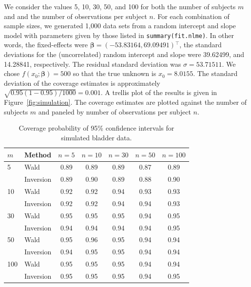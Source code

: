 \documentclass{article}\usepackage[]{graphicx}\usepackage[]{color}
\newcommand{\trans}{\ensuremath{^\top}}
\begin{document}
We consider the values 5, 10, 30, 50, and 100 for both the number of subjects $m$ and and the number of observations per subject $n$.  For each combination of sample sizes, we generated 1,000 data sets from a random intercept and slope model with parameters given by those listed in \texttt{summary(fit.nlme)}.  In other words, the fixed-effects were $\bm{\beta} = \left(-53.83164, 69.09491\right)\trans$, the standard deviations for the (uncorrelated) random intercept and slope were 39.62499, and 14.28841, respectively.  The residual standard deviation was $\sigma = 53.71511$.  We chose $f\left(x_0; \bm{\beta}\right) = 500$ so that the true unknown is $x_0 = 8.0155$.  The standard deviation of the coverage estimates is approximately $\sqrt{0.95\left(1-0.95\right)/1000} = 0.001$.  A trellis plot of the results is given in Figure~\ref{fig:simulation}.  The coverage estimates are plotted against the number of subjects $m$ and paneled by number of observations per subject $n$.
\begin{table}[!htb]
\centering
\begin{tabular}{llccccc}
  \toprule
  $m$  & Method    & \hspace{8pt}$n = 5$\hspace{8pt} & \hspace{8pt}$n = 10$\hspace{8pt} & \hspace{8pt}$n = 30$\hspace{8pt} & \hspace{8pt}$n = 50$\hspace{8pt} & \hspace{8pt}$n = 100$ \hspace{8pt} \\
  \hline
  5    & Wald      & 0.89    & 0.89     & 0.89     & 0.87     & 0.89      \\
       & Inversion & 0.89    & 0.90     & 0.89     & 0.88     & 0.90      \\ \hline
  10   & Wald      & 0.92    & 0.92     & 0.94     & 0.93     & 0.93      \\
       & Inversion & 0.92    & 0.92     & 0.94     & 0.94     & 0.93      \\ \hline
  30   & Wald      & 0.95    & 0.95     & 0.95     & 0.94     & 0.95      \\
       & Inversion & 0.94    & 0.94     & 0.94     & 0.94     & 0.95      \\ \hline
  50   & Wald      & 0.95    & 0.96     & 0.95     & 0.94     & 0.94      \\
       & Inversion & 0.94    & 0.95     & 0.95     & 0.94     & 0.94      \\ \hline
  100  & Wald      & 0.95    & 0.95     & 0.95     & 0.94     & 0.94      \\
       & Inversion & 0.95    & 0.95     & 0.95     & 0.94     & 0.95      \\
  \bottomrule
\end{tabular}
\caption{Coverage probability of 95\% confidence intervals for simulated bladder data. \label{tab:simulation}}
\end{table}%
\end{document}

